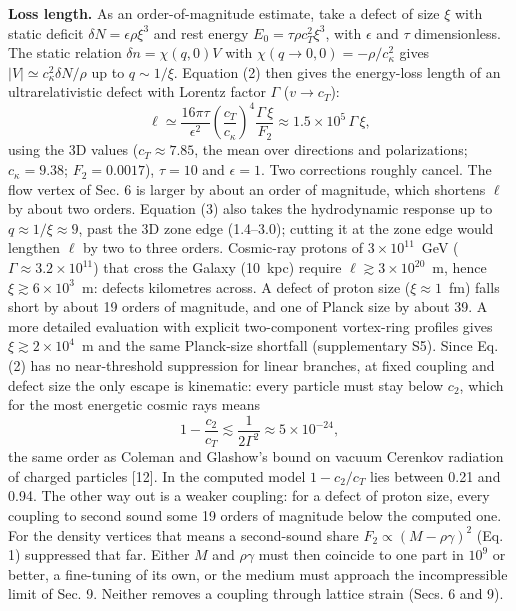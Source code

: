 \documentclass[
  11pt,
]{article}
\begin{document}
\textbf{Loss length.} As an order-of-magnitude estimate, take a defect
of size \(\xi\) with static deficit \(\delta N=\epsilon\rho\xi^3\) and
rest energy \(E_0=\tau\rho c_T^2\xi^3\), with \(\epsilon\) and \(\tau\)
dimensionless. The static relation \(\delta n=\chi(q,0)V\) with
\(\chi(q\to0,0)=-\rho/c_\kappa^2\) gives
\(|V|\simeq c_\kappa^2\delta N/\rho\) up to \(q\sim1/\xi\). Equation (2)
then gives the energy-loss length of an ultrarelativistic defect with
Lorentz factor \(\Gamma\) (\(v\to c_T\)):
\[\ell\simeq\frac{16\pi\tau}{\epsilon^2}\left(\frac{c_T}{c_\kappa}\right)^4\frac{\Gamma\,\xi}{F_2}\approx1.5\times10^5\,\Gamma\,\xi ,\tag{3}\]
using the 3D values (\(c_T\approx7.85\), the mean over directions and
polarizations; \(c_\kappa=9.38\); \(F_2=0.0017\)), \(\tau=10\) and
\(\epsilon=1\). Two corrections roughly cancel. The flow vertex of Sec.
6 is larger by about an order of magnitude, which shortens \(\ell\) by
about two orders. Equation (3) also takes the hydrodynamic response up
to \(q\approx1/\xi\approx9\), past the 3D zone edge (1.4--3.0); cutting
it at the zone edge would lengthen \(\ell\) by two to three orders.
Cosmic-ray protons of \(3\times10^{11}\)~GeV
(\(\Gamma\approx3.2\times10^{11}\)) that cross the Galaxy (10~kpc)
require \(\ell\gtrsim3\times10^{20}\)~m, hence
\(\xi\gtrsim6\times10^3\)~m: defects kilometres across. A defect of
proton size (\(\xi\approx1\)~fm) falls short by about 19 orders of
magnitude, and one of Planck size by about 39. A more detailed
evaluation with explicit two-component vortex-ring profiles gives
\(\xi\gtrsim2\times10^4\)~m and the same Planck-size shortfall
(supplementary S5). Since Eq. (2) has no near-threshold suppression for
linear branches, at fixed coupling and defect size the only escape is
kinematic: every particle must stay below \(c_2\), which for the most
energetic cosmic rays means
\[1-\frac{c_2}{c_T}\lesssim\frac{1}{2\Gamma^2}\approx5\times10^{-24},\tag{4}\]
the same order as Coleman and Glashow's bound on vacuum Cerenkov
radiation of charged particles {[}12{]}. In the computed model
\(1-c_2/c_T\) lies between 0.21 and 0.94. The other way out is a weaker
coupling: for a defect of proton size, every coupling to second sound
some 19 orders of magnitude below the computed one. For the density
vertices that means a second-sound share \(F_2\propto(M-\rho\gamma)^2\)
(Eq. 1) suppressed that far. Either \(M\) and \(\rho\gamma\) must then
coincide to one part in \(10^9\) or better, a fine-tuning of its own, or
the medium must approach the incompressible limit of Sec. 9. Neither
removes a coupling through lattice strain (Secs. 6 and 9).
\end{document}
